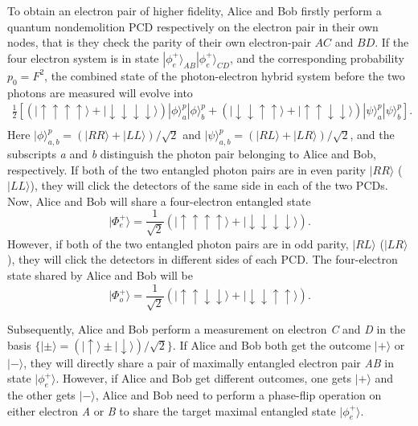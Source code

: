 \documentclass[aps,graphicx,twocolumn]{revtex4}%
\begin{document}
To obtain an electron pair of higher fidelity, Alice and Bob  firstly perform a quantum nondemolition PCD respectively on the electron pair in their own nodes, that is they check the parity of their own electron-pair $AC$ and $BD$. If the four electron system is in state $|\phi^{+}_e\rangle_{AB}|\phi^{+}_e\rangle_{CD}$, and the corresponding probability $p_0=F^2$, the combined state of the photon-electron hybrid system before the two photons are measured will evolve into
\begin{eqnarray}\label{puri1}
\frac{1}{2}[(|\!\!\uparrow\uparrow\uparrow\uparrow\rangle+
  |\!\!\downarrow\downarrow\downarrow\downarrow\rangle)|\phi\rangle_a^p|\phi\rangle_b^p
+(|\!\!\downarrow\downarrow\uparrow\uparrow\rangle+
  |\!\!\uparrow\uparrow\downarrow\downarrow\rangle)|\psi\rangle_a^p|\psi\rangle_b^p].\nonumber\\
\end{eqnarray}
Here $|\phi\rangle^p_{a,b}=(|RR\rangle+|LL\rangle)/\sqrt{2}$
and $|\psi\rangle^p_{a,b}=(|RL\rangle+|LR\rangle)/\sqrt{2}$, and the subscripts \emph{a} and \emph{b} distinguish the photon pair belonging to Alice and Bob, respectively. If both of the two entangled photon pairs are in even parity $|RR\rangle$ ($|LL\rangle$), they will click the detectors of the same side in each of the two PCDs. Now, Alice and Bob will share a  four-electron entangled state
\begin{equation}\label{four}
  |\Phi_e^{+}\rangle=\frac{1}{\sqrt2}(|\!\!\uparrow\uparrow\uparrow\uparrow\rangle+
  |\!\!\downarrow\downarrow\downarrow\downarrow\rangle).
\end{equation}
However, if both of the two entangled photon pairs are in odd parity, $|RL\rangle$ ($|LR\rangle$), they will click the detectors in different sides of each PCD. The four-electron state shared by Alice and Bob will be
\begin{equation}\label{four2}
  |\Phi_o^{+}\rangle=\frac{1}{\sqrt2}(|\!\!\uparrow\uparrow\downarrow\downarrow\rangle+
  |\!\!\downarrow\downarrow\uparrow\uparrow\rangle).
\end{equation}

Subsequently, Alice and Bob perform a measurement on electron \emph{C} and \emph{D} in the basis $\{|\pm\rangle=(|\uparrow\rangle\pm|\downarrow\rangle)/{\sqrt2}\}$. If Alice and Bob both get the outcome $|+\rangle$ or $|-\rangle$, they will directly share a pair of maximally entangled electron pair \emph{AB} in state $|\phi^{+}_e\rangle$. However, if Alice and Bob get different outcomes, one gets $|+\rangle$ and the other gets $|-\rangle$, Alice and Bob need to perform a phase-flip operation on either electron \emph{A} or \emph{B} to share the target maximal entangled state $|\phi^{+}_e\rangle$.
\end{document}
